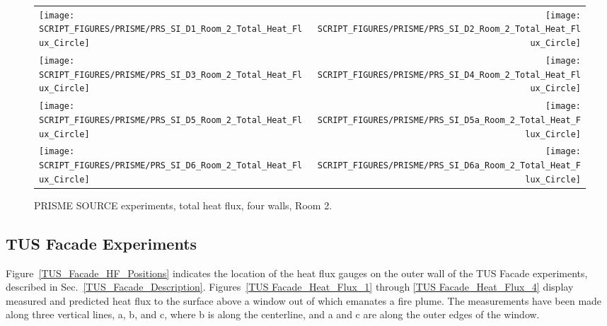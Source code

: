 \begin{figure}[p]
\begin{tabular*}{\textwidth}{l@{\extracolsep{\fill}}r}
\texttt{[image: SCRIPT\_FIGURES/PRISME/PRS\_SI\_D1\_Room\_2\_Total\_Heat\_Flux\_Circle]} &
\texttt{[image: SCRIPT\_FIGURES/PRISME/PRS\_SI\_D2\_Room\_2\_Total\_Heat\_Flux\_Circle]} \\
\texttt{[image: SCRIPT\_FIGURES/PRISME/PRS\_SI\_D3\_Room\_2\_Total\_Heat\_Flux\_Circle]} &
\texttt{[image: SCRIPT\_FIGURES/PRISME/PRS\_SI\_D4\_Room\_2\_Total\_Heat\_Flux\_Circle]} \\
\texttt{[image: SCRIPT\_FIGURES/PRISME/PRS\_SI\_D5\_Room\_2\_Total\_Heat\_Flux\_Circle]} &
\texttt{[image: SCRIPT\_FIGURES/PRISME/PRS\_SI\_D5a\_Room\_2\_Total\_Heat\_Flux\_Circle]} \\
\texttt{[image: SCRIPT\_FIGURES/PRISME/PRS\_SI\_D6\_Room\_2\_Total\_Heat\_Flux\_Circle]} &
\texttt{[image: SCRIPT\_FIGURES/PRISME/PRS\_SI\_D6a\_Room\_2\_Total\_Heat\_Flux\_Circle]}
\end{tabular*}
\caption[PRISME SOURCE experiments, total heat flux, four walls, Room 2]{PRISME SOURCE experiments, total heat flux, four walls, Room 2.}
\label{PRISME_SOURCE_Wall_Circle_THF_Room_2}
\end{figure}

\clearpage


\subsection{TUS Facade Experiments}
\label{TUS_Facade_Heat_Flux}

Figure~\ref{TUS_Facade_HF_Positions} indicates the location of the heat flux gauges on the outer wall of the TUS Facade experiments, described in Sec.~\ref{TUS_Facade_Description}. Figures~\ref{TUS Facade_Heat_Flux_1} through \ref{TUS Facade_Heat_Flux_4} display measured and predicted heat flux to the surface above a window out of which emanates a fire plume. The measurements have been made along three vertical lines, a, b, and c, where b is along the centerline, and a and c are along the outer edges of the window.

